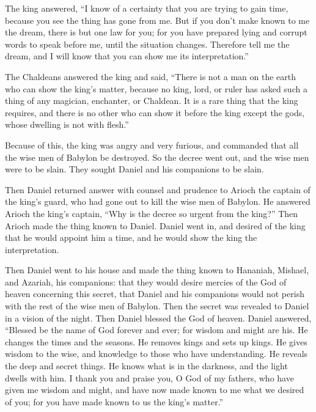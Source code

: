  The king answered, ``I know of a certainty that you are
trying to gain time, because you see the thing has gone from me.
 But if you don't make known to me the dream, there is but
one law for you; for you have prepared lying and corrupt words to speak
before me, until the situation changes. Therefore tell me the dream, and
I will know that you can show me its interpretation.''

 The Chaldeans answered the king and said, ``There is not a
man on the earth who can show the king's matter, because no king, lord,
or ruler has asked such a thing of any magician, enchanter, or Chaldean.
 It is a rare thing that the king requires, and there is no
other who can show it before the king except the gods, whose dwelling is
not with flesh.''

 Because of this, the king was angry and very furious, and
commanded that all the wise men of Babylon be destroyed. 
So the decree went out, and the wise men were to be slain. They sought
Daniel and his companions to be slain.

 Then Daniel returned answer with counsel and prudence to
Arioch the captain of the king's guard, who had gone out to kill the
wise men of Babylon.  He answered Arioch the king's
captain, ``Why is the decree so urgent from the king?'' Then Arioch made
the thing known to Daniel.  Daniel went in, and desired of
the king that he would appoint him a time, and he would show the king
the interpretation.

 Then Daniel went to his house and made the thing known to
Hananiah, Mishael, and Azariah, his companions:  that they
would desire mercies of the God of heaven concerning this secret, that
Daniel and his companions would not perish with the rest of the wise men
of Babylon.  Then the secret was revealed to Daniel in a
vision of the night. Then Daniel blessed the God of heaven.
 Daniel answered, ``Blessed be the name of God forever and
ever; for wisdom and might are his.  He changes the times
and the seasons. He removes kings and sets up kings. He gives wisdom to
the wise, and knowledge to those who have understanding. 
He reveals the deep and secret things. He knows what is in the darkness,
and the light dwells with him.  I thank you and praise you,
O God of my fathers, who have given me wisdom and might, and have now
made known to me what we desired of you; for you have made known to us
the king's matter.''

